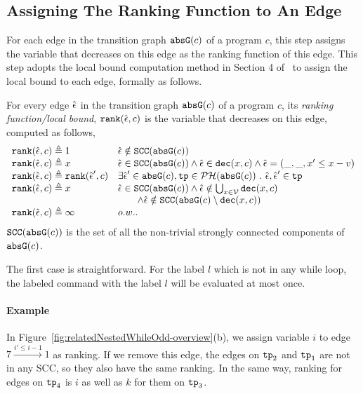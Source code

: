  \subsection{Assigning The Ranking Function to An Edge}
 For each edge in the transition graph $\mathtt{abs}{\mathtt{G}}(c)$ of a program $c$,
 this step assigns the variable that decreases on this edge as the ranking function of this edge.
 This step adopts the local bound computation method in Section 4 of~\cite{SinnZV17} to assign the local bound to each edge,
 formally as follows.
 \begin{defn}
 \label{def:ranking_gen}
 For every edge $\hat{\mathtt{\epsilon}{}}$ in the transition graph $\mathtt{abs}{\mathtt{G}}(c)$ of a program $c$,
 its \emph{ranking function/local bound}, $\mathtt{rank}(\hat{\mathtt{\epsilon}{}}, c)$
 is the variable that decreases on this edge, computed as follows,
 \[ 
\begin{array}{ll}
 \mathtt{rank}(\hat{\mathtt{\epsilon}{}}, c) \triangleq 1 
 & \hat{\mathtt{\epsilon}{}} \notin \mathtt{SCC}(\mathtt{abs}{\mathtt{G}}(c))
 \\
 \mathtt{rank}(\hat{\mathtt{\epsilon}{}}, c) \triangleq x
 & \hat{\mathtt{\epsilon}{}} \in \mathtt{SCC}(\mathtt{abs}{\mathtt{G}}(c)) \land \hat{\mathtt{\epsilon}{}} \in \mathtt{dec}(x, c) \land \hat{\mathtt{\epsilon}{}} = (\_, \_ , x' \leq x - v) \\
 \mathtt{rank}(\hat{\mathtt{\epsilon}{}}, c) \triangleq \mathtt{rank}(\hat{\mathtt{\epsilon}{}}', c)
 & \exists \hat{\mathtt{\epsilon}{}}' \in \mathtt{abs}{\mathtt{G}}(c), \mathtt{tp} \in \mathcal{PH}( \mathtt{abs}{\mathtt{G}}(c)) ~.~ \hat{\mathtt{\epsilon}{}}, \hat{\mathtt{\epsilon}{}}' \in \mathtt{tp} \\
 \mathtt{rank}(\hat{\mathtt{\epsilon}{}}, c) \triangleq x
 & \hat{\mathtt{\epsilon}{}} \in \mathtt{SCC}(\mathtt{abs}{\mathtt{G}}(c)) \land 
 \hat{\mathtt{\epsilon}{}} \notin \bigcup_{x \in \mathcal{V}} \mathtt{dec}(x, c) \\
 & \qquad \land \hat{\mathtt{\epsilon}{}} \notin \mathtt{SCC}(\mathtt{abs}{\mathtt{G}}(c) \setminus \mathtt{dec}(x, c))\\
 \mathtt{rank}(\hat{\mathtt{\epsilon}{}}, c) \triangleq \infty
 & o.w..
\end{array}
\]
 $\mathtt{SCC}(\mathtt{abs}{\mathtt{G}}(c))$ is the set of all the non-trivial strongly connected components of $\mathtt{abs}{\mathtt{G}}(c)$.
 \end{defn}
 The first case is straightforward. 
 For the label $l$ which is not in any while loop, 
 the labeled command with the label $l$ will be 
 evaluated at most once. 

 \paragraph{Example}
 In Figure~\ref{fig:relatedNestedWhileOdd-overview}(b), we assign variable $i$ to edge $7 \xrightarrow{i' \leq i - 1} 1$ as ranking.
 If we remove this edge, the edges on $\mathtt{tp}_2$ and $\mathtt{tp}_1$ are not in any SCC, so they also have the same ranking.
In the same way, ranking for edges on $\mathtt{tp}_4$ is $i$ as well as $k$ for them on $\mathtt{tp}_3$.


